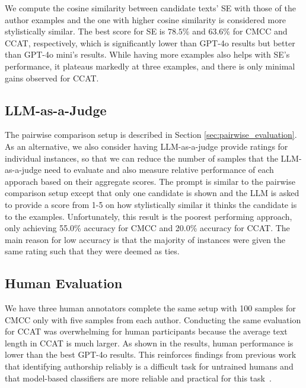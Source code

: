 We compute the cosine similarity between candidate texts' SE with those of the author examples and the one with higher cosine similarity is considered more stylistically similar. 
The best score for SE is $78.5\%$ and $63.6\%$ for CMCC and CCAT, respectively, which is significantly lower than GPT-4o results but better than GPT-4o mini's results.
While having more examples also helps with SE's performance, it plateaus markedly at three examples, and there is only minimal gains observed for CCAT. 




\subsection{LLM-as-a-Judge}
\label{appdx:llm as a judge}

The pairwise comparison setup is described in Section \ref{sec:pairwise_evaluation}. 
As an alternative, we also consider having LLM-as-a-judge provide ratings for individual instances, so that we can reduce the number of samples that the LLM-as-a-judge need to evaluate and also measure relative performance of each apporach based on their aggregate scores. 
The prompt is similar to the pairwise comparison setup except that only one candidate is shown and the LLM is asked to provide a score from 1-5 on how stylistically similar it thinks the candidate is to the examples. 
Unfortunately, this result is the poorest performing approach, only achieving 55.0\% accuracy for CMCC and 20.0\% accuracy for CCAT. 
The main reason for low accuracy is that the majority of instances were given the same rating such that they were deemed as ties. 


\subsection{Human Evaluation}
\label{appdx:human_evaluation}
We have three human annotators complete the same setup with 100 samples for CMCC only with five samples from each author. 
Conducting the same evaluation for CCAT was overwhelming for human participants because the average text length in CCAT is much larger.
As shown in the results, human performance is lower than the best GPT-4o results. 
This reinforces findings from previous work that identifying authorship reliably is a difficult task for untrained humans and that model-based classifiers are more reliable and practical for this task~\cite{hallinan-etal-2023-steer, krishna-etal-2020-reformulating, liu2024authorshipstyletransferpolicy, liu2024styletransfermultiiterationpreference}.  



